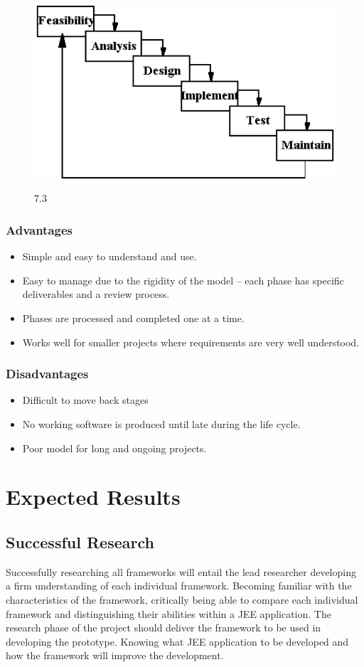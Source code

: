 \begin{figure}[!htb]
	\includegraphics[width=.8\textwidth]{img33.png}
	\begin{center}
		\figurename{ 7.3}
	\end{center}
\end{figure}

\subsubsection{Advantages}
\begin{itemize}
	\item Simple and easy to understand and use.
	\item Easy to manage due to the rigidity of the model – each phase has specific deliverables and a review process.
	\item Phases are processed and completed one at a time.
	\item Works well for smaller projects where requirements are very well understood.
\end{itemize}

\subsubsection{Disadvantages}
\begin{itemize}
	\item Difficult to move back stages
	\item No working software is produced until late during the life cycle.
	\item Poor model for long and ongoing projects.
\end{itemize}

\newpage

\section{Expected Results}
\subsection{Successful Research}
Successfully researching all frameworks will entail the lead researcher developing a firm understanding of each individual framework. Becoming familiar with the characteristics of the framework, critically being able to compare each individual framework and distinguishing their abilities within a JEE application. The research phase of the project should deliver the framework to be used in developing the prototype. Knowing what JEE application to be developed and how the framework will improve the development.

